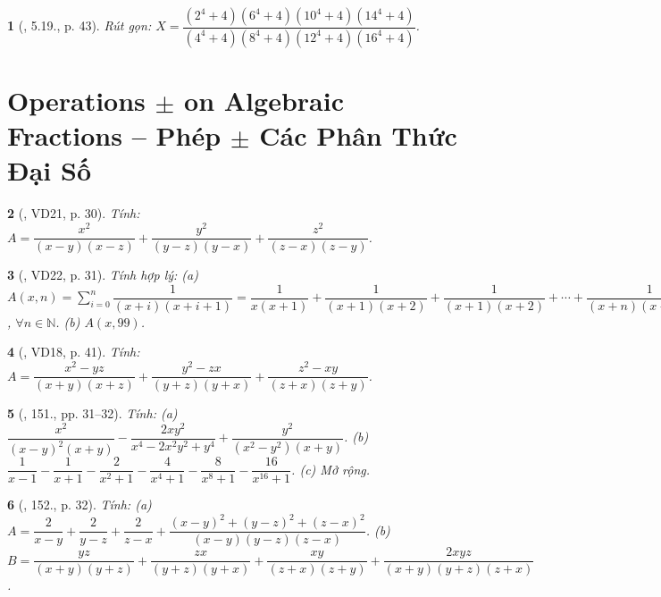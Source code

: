 \documentclass{article}
\newtheorem{baitoan}{}
\begin{document}
\begin{baitoan}[\cite{TLCT_THCS_Toan_8_dai_so}, 5.19., p. 43]
	Rút gọn: $X = \dfrac{(2^4 + 4)(6^4 + 4)(10^4 + 4)(14^4 + 4)}{(4^4 + 4)(8^4 + 4)(12^4 + 4)(16^4 + 4)}$.
\end{baitoan}


\section{Operations $\pm$ on Algebraic Fractions -- Phép $\pm$ Các Phân Thức Đại Số}

\begin{baitoan}[\cite{Tuyen_Toan_8}, VD21, p. 30]
	Tính: $A = \dfrac{x^2}{(x - y)(x - z)} + \dfrac{y^2}{(y - z)(y - x)} + \dfrac{z^2}{(z - x)(z - y)}$.
\end{baitoan}

\begin{baitoan}[\cite{Tuyen_Toan_8}, VD22, p. 31]
	Tính hợp lý: (a) $A(x,n) = \sum_{i=0}^n \dfrac{1}{(x + i)(x + i + 1)} = \dfrac{1}{x(x + 1)} + \dfrac{1}{(x + 1)(x + 2)} + \dfrac{1}{(x + 1)(x + 2)} + \cdots + \dfrac{1}{(x + n)(x + n + 1)}$, $\forall n\in\mathbb{N}$. (b) $A(x,99)$.
\end{baitoan}

\begin{baitoan}[\cite{Tuyen_Toan_8_old}, VD18, p. 41]
	Tính: $A = \dfrac{x^2 - yz}{(x + y)(x + z)} + \dfrac{y^2 - zx}{(y + z)(y + x)} + \dfrac{z^2 - xy}{(z + x)(z + y)}$.
\end{baitoan}

\begin{baitoan}[\cite{Tuyen_Toan_8}, 151., pp. 31--32]
	Tính: (a) $\dfrac{x^2}{(x - y)^2(x + y)} - \dfrac{2xy^2}{x^4 - 2x^2y^2 + y^4} + \dfrac{y^2}{(x^2 - y^2)(x + y)}$. (b) $\dfrac{1}{x - 1} - \dfrac{1}{x + 1} - \dfrac{2}{x^2 + 1} - \dfrac{4}{x^4 + 1} - \dfrac{8}{x^8 + 1} - \dfrac{16}{x^{16} + 1}$. (c) Mở rộng.
\end{baitoan}

\begin{baitoan}[\cite{Tuyen_Toan_8}, 152., p. 32]
	Tính: (a) $A = \dfrac{2}{x - y} + \dfrac{2}{y - z} + \dfrac{2}{z - x} + \dfrac{(x - y)^2 + (y - z)^2 + (z - x)^2}{(x - y)(y - z)(z - x)}$. (b) $B = \dfrac{yz}{(x + y)(y + z)} + \dfrac{zx}{(y + z)(y + x)} + \dfrac{xy}{(z + x)(z + y)} + \dfrac{2xyz}{(x + y)(y + z)(z + x)}$.
\end{baitoan}
\end{document}
